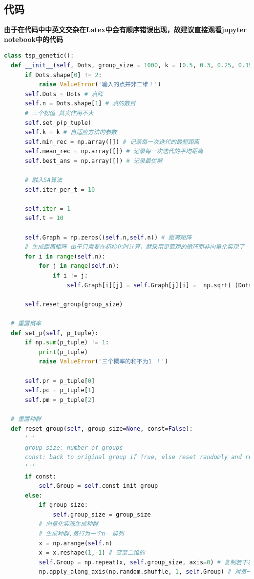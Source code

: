 \documentclass[12pt]{article}
\begin{document}
\subsection*{代码}
\textbf{由于在代码中中英文交杂在Latex中会有顺序错误出现，故建议直接观看jupyter notebook中的代码}
\begin{lstlisting}[language = Python, caption = GA算法计算TSP的类]
class tsp_genetic():
  def __init__(self, Dots, group_size = 1000, k = (0.5, 0.3, 0.25, 0.15), p_tuple=(0.4,0.4,0.2)):
      if Dots.shape[0] != 2:
          raise ValueError('输入的点并非二维！')
      self.Dots = Dots # 点阵
      self.n = Dots.shape[1] # 点的数目
      # 三个初值 其实作用不大
      self.set_p(p_tuple)
      self.k = k # 自适应方法的参数
      self.min_rec = np.array([]) # 记录每一次迭代的最短距离
      self.mean_rec = np.array([]) # 记录每一次迭代的平均距离
      self.best_ans = np.array([]) # 记录最优解
      
      # 融入SA算法
      self.iter_per_t = 10

      self.iter = 1
      self.t = 10

      self.Graph = np.zeros((self.n,self.n)) # 距离矩阵
      # 生成距离矩阵 由于只需要在初始化时计算，就采用更直观的循环而非向量化实现了
      for i in range(self.n):
          for j in range(self.n):
              if i != j:
                  self.Graph[i][j] = self.Graph[j][i] =  np.sqrt( (Dots[0,i] - Dots[0,j])**2 + (Dots[1,i] - Dots[1,j])**2 ) 
      
      self.reset_group(group_size)
      
  # 重置概率
  def set_p(self, p_tuple):
      if np.sum(p_tuple) != 1:
          print(p_tuple)
          raise ValueError('三个概率的和不为1 ！')

      self.pr = p_tuple[0]
      self.pc = p_tuple[1]
      self.pm = p_tuple[2]
  
  # 重置种群
  def reset_group(self, group_size=None, const=False):
      '''
      group_size: number of groups
      const: back to original group if True, else reset randomly and renew const_init_group
      '''
      if const:
          self.Group = self.const_init_group
      else:
          if group_size:
              self.group_size = group_size
          # 向量化实现生成种群
          # 生成种群,每行为一个n- 排列
          x = np.arange(self.n)
          x = x.reshape(1,-1) # 变至二维的
          self.Group = np.repeat(x, self.group_size, axis=0) # 复制若干次
          np.apply_along_axis(np.random.shuffle, 1, self.Group) # 对每一行打乱


\end{lstlisting}
\end{document}
